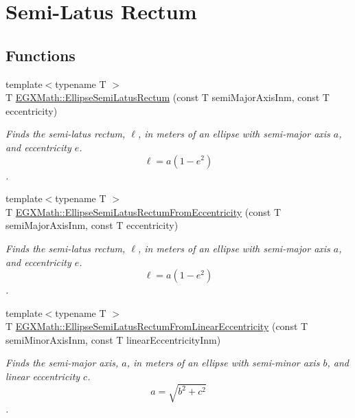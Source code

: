 \hypertarget{group___e_g_x_math-_geometry-2_d-_ellipse-_semi_latus_rectum}{}\section{Semi-\/\+Latus Rectum}
\label{group___e_g_x_math-_geometry-2_d-_ellipse-_semi_latus_rectum}
\subsection*{Functions}
\begin{DoxyCompactItemize}
\item 
{\footnotesize template$<$typename T $>$ }\\T \mbox{\hyperlink{group___e_g_x_math-_geometry-2_d-_ellipse-_semi_latus_rectum_gacfd1844eb4ef3d1ee3c0b460a6442ae6}{E\+G\+X\+Math\+::\+Ellipse\+Semi\+Latus\+Rectum}} (const T semi\+Major\+Axis\+Inm, const T eccentricity)
\begin{DoxyCompactList}\small\item\em Finds the semi-\/latus rectum, $\ell$, in meters of an ellipse with semi-\/major axis $a$, and eccentricity $e$. \[ \ell=a(1-e^2) \]. \end{DoxyCompactList}\item 
{\footnotesize template$<$typename T $>$ }\\T \mbox{\hyperlink{group___e_g_x_math-_geometry-2_d-_ellipse-_semi_latus_rectum_ga06c95ba97ceac8e0abea5a7611a5812f}{E\+G\+X\+Math\+::\+Ellipse\+Semi\+Latus\+Rectum\+From\+Eccentricity}} (const T semi\+Major\+Axis\+Inm, const T eccentricity)
\begin{DoxyCompactList}\small\item\em Finds the semi-\/latus rectum, $\ell$, in meters of an ellipse with semi-\/major axis $a$, and eccentricity $e$. \[ \ell=a(1-e^2) \]. \end{DoxyCompactList}\item 
{\footnotesize template$<$typename T $>$ }\\T \mbox{\hyperlink{group___e_g_x_math-_geometry-2_d-_ellipse-_semi_latus_rectum_ga41f9f0fcd4b1169a4e908496cdab158d}{E\+G\+X\+Math\+::\+Ellipse\+Semi\+Latus\+Rectum\+From\+Linear\+Eccentricity}} (const T semi\+Minor\+Axis\+Inm, const T linear\+Eccentricity\+Inm)
\begin{DoxyCompactList}\small\item\em Finds the semi-\/major axis, $a$, in meters of an ellipse with semi-\/minor axis $b$, and linear eccentricity $c$. \[ a=\sqrt{b^2+c^2} \]. \end{DoxyCompactList}\item 

\end{DoxyCompactItemize}
